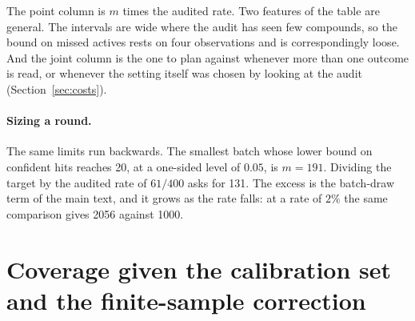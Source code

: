 \documentclass[10pt]{article}
\begin{document}
\noindent The point column is $m$ times the audited rate. Two features of the table are
general. The intervals are wide where the audit has seen few compounds, so the bound on
missed actives rests on four observations and is correspondingly loose. And the joint column
is the one to plan against whenever more than one outcome is read, or whenever the setting
itself was chosen by looking at the audit (Section~\ref{sec:costs}).

\paragraph{Sizing a round.} The same limits run backwards. The smallest batch whose lower
bound on confident hits reaches 20, at a one-sided level of $0.05$, is $m=191$. Dividing the
target by the audited rate of $61/400$ asks for 131. The excess is the batch-draw term of
the main text, and it grows as the rate falls: at a rate of $2\%$ the same comparison gives
2056 against 1000.

\section{Coverage given the calibration set and the finite-sample correction}
\label{sec:correction}
\end{document}
